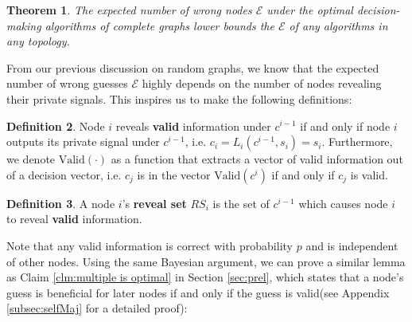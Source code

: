 \documentclass[a4paper,UKenglish]{lipics}
\newtheorem{thm}{Theorem}[section] %
\theoremstyle{definition}
\newtheorem{defn}[thm]{Definition}
\begin{document}
\begin{thm}
\label{thm:complete graphs bound}
The expected number of wrong nodes $\mathcal{E}$ under the optimal decision-making algorithms of complete graphs lower bounds the $\mathcal{E}$ of any algorithms in any topology.
\end{thm}

From our previous discussion on random graphs, we know that the expected number of wrong guesses $\mathcal{E}$ highly depends on the number of nodes revealing their private signals.
This inspires us to make the following definitions:
\begin{defn}
Node $i$ reveals \textbf{valid} information under $c^{i-1}$ 
	if and only if node $i$ outputs its private signal under $c^{i-1}$, 
	i.e. $c_i = L_i(c^{i-1}, s_i) = s_i$.
Furthermore, we denote $\text{Valid}(\cdot)$ as a function that extracts a vector of valid information out of a decision vector, i.e. 
	$c_j$ is in the vector $\text{Valid}(c^{i})$ if and only if $c_j$ is valid.
\end{defn}

\begin{defn}
A node $i$'s \textbf{reveal set} $RS_i$ is the set of $c^{i-1}$ which causes node $i$ to reveal \textbf{valid} information.
\end{defn}


Note that any valid information is correct with probability $p$ and is independent of other nodes. Using the same Bayesian argument\cite{easley2010networks}, we can prove a similar lemma as Claim \ref{clm:multiple is optimal} in Section \ref{sec:prel}, which states that a node's guess is beneficial for later nodes if and only if the guess is valid(see Appendix \ref{subsec:selfMaj} for a detailed proof):
\end{document}
